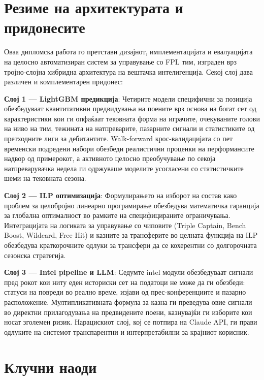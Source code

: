 
\section{Резиме на архитектурата и придонесите}

Оваа дипломска работа го претстави дизајнот, имплементацијата и евалуацијата на целосно автоматизиран систем за управување со FPL тим, изграден врз тројно-слојна хибридна архитектура на вештачка интелигенција. Секој слој дава различен и комплементарен придонес:

\textbf{Слој 1 — LightGBM предикција}: Четирите модели специфични за позиција обезбедуваат квантитативни предвидувања на поените врз основа на богат сет од карактеристики кои ги опфаќаат тековната форма на играчите, очекуваните голови на ниво на тим, тежината на натпреварите, пазарните сигнали и статистиките од претходните лиги за дебитантите. Walk-forward крос-валидацијата со пет временски подредени набори обезбеди реалистични проценки на перформансите надвор од примерокот, а активното целосно преобучување по секоја натпреварувачка недела ги одржуваше моделите усогласени со статистичките шеми на тековната сезона.

\textbf{Слој 2 — ILP оптимизација}: Формулирањето на изборот на состав како проблем за целобројно линеарно програмирање обезбедува математичка гаранција за глобална оптималност во рамките на специфицираните ограничувања. Интеграцијата на логиката за управување со чиповите (Triple Captain, Bench Boost, Wildcard, Free Hit) и казните за трансферите во целната функција на ILP обезбедува краткорочните одлуки за трансфери да се кохерентни со долгорочната сезонска стратегија.

\textbf{Слој 3 — Intel pipeline и LLM}: Седумте intel модули обезбедуваат сигнали пред рокот кои ниту еден историски сет на податоци не може да ги обезбеди: статуси на повреди во реално време, изјави од прес-конференциите и пазарно расположение. Мултипликативната формула за казна ги преведува овие сигнали во директни прилагодувања на предвидените поени, казнувајќи ги изборите кои носат зголемен ризик. Нарацискиот слој, кој се потпира на Claude API, ги прави одлуките на системот транспарентни и интерпретабилни за крајниот корисник.

\section{Клучни наоди}


